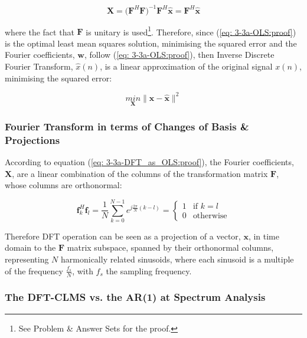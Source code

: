 \documentclass[12pt]{article}
\def\vf{{\bm{f}}}
\def\vx{{\bm{x}}}
\def\vw{{\bm{w}}}
\begin{document}
			\begin{equation}
			\mathbf{X} = \bigg( \mathbf{F}^{H} \mathbf{F} \bigg)^{-1} \mathbf{F}^{H} \hat{\vx} = \mathbf{F}^{H} \hat{\vx}
			\label{eq: 3-3a-DFT_as_OLS:proof}
			\end{equation}
			
			where the fact that $\mathbf{F}$ is unitary is used\footnote{See Problem \& Answer Sets for the proof.}.
			Therefore, since (\ref{eq: 3-3a-OLS:proof}) is the optimal least mean squares solution, minimising the squared error and the Fourier coefficients, $\vw$, follow (\ref{eq: 3-3a-OLS:proof}),
			then Inverse Discrete Fourier Transform, $\hat{x}(n)$, is a linear approximation of the original signal $x(n)$, minimising the squared error:
			
			\begin{equation}
			\underset{\mathbf{X}}{min} \| \vx - \hat{\vx} \|^{2}
			\end{equation}
			
		\subsubsection{Fourier Transform in terms of Changes of Basis \& Projections}
			According to equation (\ref{eq: 3-3a-DFT_as_OLS:proof}), the Fourier coefficients, $\mathbf{X}$, are a linear combination of the columns of the transformation matrix $\mathbf{F}$, whose columns are orthonormal:
			
			\begin{equation}
			\vf_{k}^{H} \vf_{l} = \frac{1}{N} \sum_{k=0}^{N-1} e^{j \frac{2\pi}{N} (k-l)} = \left\{
			\begin{array}{ll}
			1 & \text{if } k=l\\
			0 & \text{otherwise}
			\end{array} \right.
			\end{equation}
			
			Therefore DFT operation can be seen as a projection of a vector, $\vx$, in time domain to the $\mathbf{F}$ matrix subspace, spanned by their orthonormal columns,
			representing $N$ harmonically related sinusoids, where each sinusoid is a multiple of the frequency $\frac{f_{s}}{N}$, with $f_{s}$ the sampling frequency.
		\subsubsection{The DFT-CLMS vs. the AR(1) at Spectrum Analysis}
		
\end{document}

